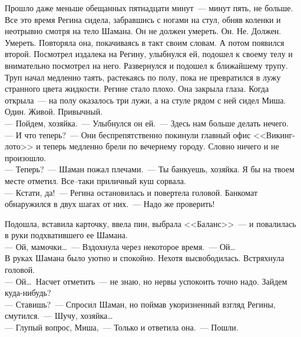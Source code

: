 Прошло даже меньше обещанных пятнадцати минут~--- минут пять, не больше. Все 
это время Регина сидела, забравшись с ногами на стул, обняв коленки и неотрывно 
смотря на тело Шамана. Он не должен умереть. Он. Не. Должен. Умереть. Повторяла 
она, покачиваясь в такт своим словам. А потом появился второй. Посмотрел 
издалека на Регину, улыбнулся ей, подошел к своему телу и внимательно посмотрел 
на него. Развернулся и подошел к ближайшему трупу. Труп начал медленно таять, 
растекаясь по полу, пока не превратился в лужу странного цвета жидкости. Регине 
стало плохо. Она закрыла глаза. Когда открыла~--- на полу оказалось три лужи, а 
на стуле рядом с ней сидел Миша. Один. Живой. Привычный.\\
--- Пойдем, хозяйка.~--- Улыбнулся он ей.~--- Здесь нам больше делать нечего.\\
--- И что теперь?~--- Они беспрепятственно покинули главный офис <<Викинг-лото>> 
и теперь медленно брели по вечернему городу. Словно ничего и не произошло.\\
--- Теперь?~--- Шаман пожал плечами.~--- Ты банкуешь, хозяйка. Я бы на твоем 
месте отметил. Все--таки приличный куш сорвала.\\
--- Кстати, да!~--- Регина остановилась и повертела головой. Банкомат обнаружился 
в двух шагах от них.~--- Надо же проверить!

Подошла, вставила карточку, ввела пин, выбрала <<Баланс>>~--- и повалилась в 
руки подхватившего ее Шамана.\\
--- Ой, мамочки\ldots~--- Вздохнула через некоторое время.~--- Ой\ldots\\
В руках Шамана было уютно и спокойно. Нехотя высвободилась. Встряхнула головой.\\
--- Ой\ldots\ Насчет отметить~--- не знаю, но нервы успокоить точно надо. Зайдем 
куда-нибудь?\\
--- Ставишь?~--- Спросил Шаман, но поймав укоризненный взгляд Регины, 
смутился.~--- Шучу, хозяйка\ldots\\
--- Глупый вопрос, Миша,~--- Только и ответила она.~--- Пошли.

